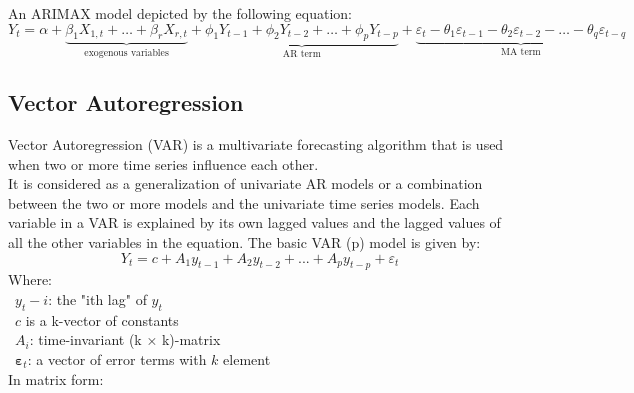 \documentclass{ieeeojies}
\begin{document}

An ARIMAX model depicted by the following equation:
\begin{dmath*}
    Y_t = \alpha
    + \underbrace{\beta_1 X_{1,t} + \ldots + \beta_r X_{r,t}}_{\text{exogenous variables}}
    + \underbrace{\phi_1 Y_{t-1} + \phi_2 Y_{t-2} + \ldots + \phi_p Y_{t-p}}_{\text{AR term}}
    + \underbrace{\varepsilon_t - \theta_1 \varepsilon_{t-1} - \theta_2 \varepsilon_{t-2} - \ldots - \theta_q \varepsilon_{t-q}}_{\text{MA term}}
\end{dmath*}

\subsection{Vector Autoregression}
Vector Autoregression (VAR) is a multivariate forecasting algorithm that is used when two or more time series influence each other. \\
It is considered as a generalization of univariate AR models or a combination between the two or more models and the univariate time series models. Each variable in a VAR is explained by its own lagged values and the lagged values of all the other variables in the equation.\cite{b8} The basic VAR (p) model is given by:
\[Y_t=c+A_1y_{t-1}+A_2y_{t-2}+...+A_py_{t-p}+\varepsilon_t\]
Where:\\
\indent\textbullet\ \(y_t-i\): the "ith lag" of \(y_t\)\\
\indent\textbullet\ \(c\) is a k-vector of constants\\
\indent\textbullet\ \(A_i\): time-invariant (k × k)-matrix\\
\indent\textbullet\ \(\boldsymbol{\varepsilon}_t\): a vector of error terms with \(k\) element\\
In matrix form:\\
\end{document}
